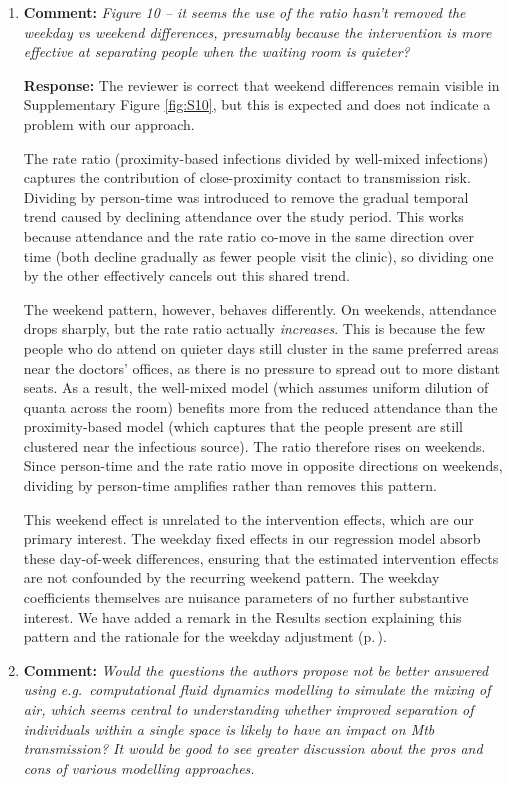 \documentclass[11pt]{article}
\newcommand{\comment}[1]{\textbf{Comment:} \textit{#1}}
\newcommand{\response}[1]{\textbf{Response:} #1}
\begin{document}
\begin{enumerate}[label=\textbf{R2.\arabic*.}, leftmargin=*]
\item\label{r:2.26} \comment{Figure 10 -- it seems the use of the ratio hasn't removed the weekday vs weekend differences, presumably because the intervention is more effective at separating people when the waiting room is quieter?}

\response{The reviewer is correct that weekend differences remain visible in Supplementary Figure \ref{fig:S10}, but this is expected and does not indicate a problem with our approach. 

The rate ratio (proximity-based infections divided by well-mixed infections) captures the contribution of close-proximity contact to transmission risk. Dividing by person-time was introduced to remove the gradual temporal trend caused by declining attendance over the study period. This works because attendance and the rate ratio co-move in the same direction over time (both decline gradually as fewer people visit the clinic), so dividing one by the other effectively cancels out this shared trend.

The weekend pattern, however, behaves differently. On weekends, attendance drops sharply, but the rate ratio actually \textit{increases}. This is because the few people who do attend on quieter days still cluster in the same preferred areas near the doctors' offices, as there is no pressure to spread out to more distant seats. As a result, the well-mixed model (which assumes uniform dilution of quanta across the room) benefits more from the reduced attendance than the proximity-based model (which captures that the people present are still clustered near the infectious source). The ratio therefore rises on weekends. Since person-time and the rate ratio move in opposite directions on weekends, dividing by person-time amplifies rather than removes this pattern.

This weekend effect is unrelated to the intervention effects, which are our primary interest. The weekday fixed effects in our regression model absorb these day-of-week differences, ensuring that the estimated intervention effects are not confounded by the recurring weekend pattern. The weekday coefficients themselves are nuisance parameters of no further substantive interest. We have added a remark in the Results section explaining this pattern and the rationale for the weekday adjustment (p.\,\pageref{chg:R2.26}).}

\item\label{r:2.27} \comment{Would the questions the authors propose not be better answered using e.g.\ computational fluid dynamics modelling to simulate the mixing of air, which seems central to understanding whether improved separation of individuals within a single space is likely to have an impact on Mtb transmission? It would be good to see greater discussion about the pros and cons of various modelling approaches.}


\end{enumerate}
\end{document}
